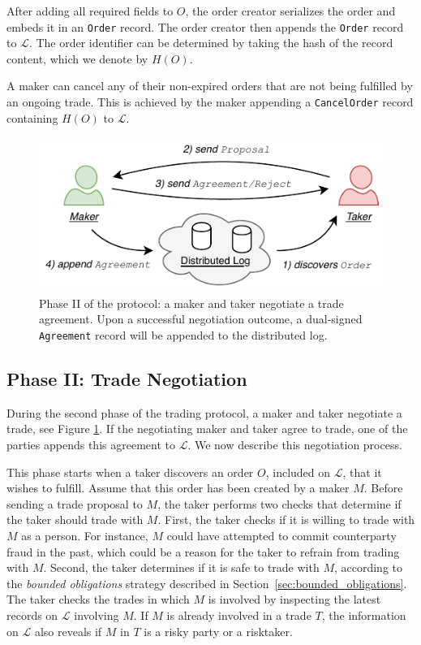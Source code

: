 After adding all required fields to $ O $, the order creator serializes the order and embeds it in an \texttt{Order} record.
The order creator then appends the \texttt{Order} record to $ \mathcal{L} $.
The order identifier can be determined by taking the hash of the record content, which we denote by $ H(O) $.

A maker can cancel any of their non-expired orders that are not being fulfilled by an ongoing trade.
This is achieved by the maker appending a \texttt{CancelOrder} record containing $ H(O) $ to $ \mathcal{L} $.

\begin{figure}[h]
	\centering
	\includegraphics[width=0.7\linewidth]{xchange/assets/xchange_protocol_2}
	\caption{Phase II of the \ModelName{} protocol: a maker and taker negotiate a trade agreement. Upon a successful negotiation outcome, a dual-signed \texttt{Agreement} record will be appended to the distributed log.}
	\label{fig:matching_protocol_2}
\end{figure}

\subsection*{Phase II: Trade Negotiation}
\label{sec:phase_clearing}

During the second phase of the \ModelName{} trading protocol, a maker and taker negotiate a trade, see Figure \ref{fig:matching_protocol_2}.
If the negotiating maker and taker agree to trade, one of the parties appends this agreement to $ \mathcal{L} $.
We now describe this negotiation process.

This phase starts when a taker discovers an order $ O $, included on $ \mathcal{L} $, that it wishes to fulfill.
Assume that this order has been created by a maker $ M $.
Before sending a trade proposal to $ M $, the taker performs two checks that determine if the taker should trade with $ M $.
First, the taker checks if it is willing to trade with $ M $ as a person.
For instance, $ M $ could have attempted to commit counterparty fraud in the past, which could be a reason for the taker to refrain from trading with $ M $.
Second, the taker determines if it is safe to trade with $ M $, according to the \emph{bounded obligations} strategy described in Section~\ref{sec:bounded_obligations}.
The taker checks the trades in which $ M $ is involved by inspecting the latest records on $ \mathcal{L} $ involving $ M $.
If $ M $ is already involved in a trade $ T $, the information on $ \mathcal{L} $ also reveals if $ M $ in $ T $ is a risky party or a risktaker.

